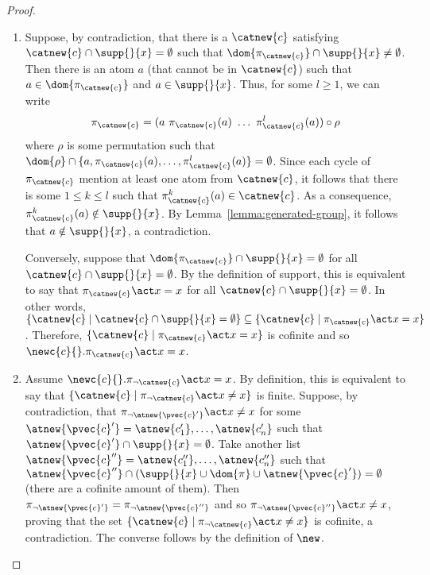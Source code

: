 \begin{proof}
\begin{enumerate}
        \item Suppose, by contradiction, that there is a $\catnew{c}$ satisfying $\catnew{c}\cap \supp{}{x} = \emptyset$ such that $\dom{\pi_{\catnew{c}}}\cap \supp{}{x} \neq \emptyset$. Then there is an atom $a$ (that cannot be in $\catnew{c}$) such that $a\in \dom{\pi_{\catnew{c}}}$ and $a\in \supp{}{x}$. Thus, for some $l\geq 1$, we can write
    \[
        \pi_{\catnew{c}} = (a\  \pi_{\catnew{c}}(a) \ \ldots \  \pi_{\catnew{c}}^l(a))\circ\rho
    \]
    where $\rho$ is some permutation such that $\dom{\rho}\cap \{a, \pi_{\catnew{c}}(a),\ldots,\pi_{\catnew{c}}^l(a)\} = \emptyset$. Since each cycle of $\pi_{\catnew{c}}$ mention at least one atom from $\catnew{c}$, it follows that there is some $1\leq k \leq l$ such that $\pi_{\catnew{c}}^k(a) \in \catnew{c}$. As a consequence, $\pi_{\catnew{c}}^k(a)\notin\supp{}{x}$. By Lemma~\ref{lemma:generated-group}, it follows that $a\notin \supp{}{x}$, a contradiction.

     Conversely, suppose that $\dom{\pi_{\catnew{c}}}\cap \supp{}{x} = \emptyset$ for all $\catnew{c}\cap\supp{}{x} = \emptyset$. By the definition of support, this is equivalent to say that $\pi_{\catnew{c}}\act x = x$ for all $\catnew{c}\cap\supp{}{x} = \emptyset$. In other words, $\{\catnew{c} \mid \catnew{c}\cap \supp{}{x} = \emptyset\} \subseteq \{\catnew{c} \mid \pi_{\catnew{c}}\act  x = x\}$. Therefore, $\{\catnew{c} \mid \pi_{\catnew{c}}\act  x = x\}$ is cofinite and so $\newc{c}{}.  \pi_{\catnew{c}}\act  x = x$.

     \item Assume $\newc{c}{}.\pi_{\neg\catnew{c}}\act x = x$. By definition, this is equivalent to say that $\{\catnew{c} \mid \pi_{\neg\catnew{c}}\act x \neq x\}$ is finite. Suppose, by contradiction, that $\pi_{\neg \atnew{\pvec{c}'}}\act x \neq x$ for some $\atnew{\pvec{c}'} = \atnew{c_1'},\ldots,\atnew{c_n'}$ such that $\atnew{\pvec{c}'}\cap\supp{}{x} = \emptyset$. Take another list $\atnew{\pvec{c}''} = \atnew{c_1''},\ldots,\atnew{c_n''}$ such that $\atnew{\pvec{c}''}\cap(\supp{}{x}\cup\dom{\pi}\cup\atnew{\pvec{c}'}) = \emptyset$ (there are a cofinite amount of them). Then $\pi_{\neg\atnew{\pvec{c}'}} = \pi_{\neg\atnew{\pvec{c}''}}$ and so $\pi_{\neg\atnew{\pvec{c}''}}\act x \neq x$, proving that the set $\{\catnew{c} \mid \pi_{\neg\catnew{c}}\act x\neq x\}$ is cofinite, a contradiction. The converse follows by the definition of $\new$.

    \end{enumerate}
\end{proof}

